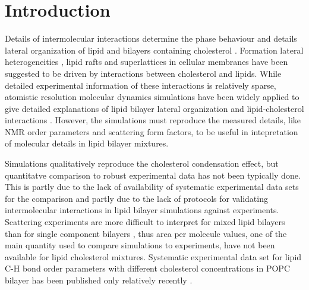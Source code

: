 \documentclass[aps,prl,superscriptaddress,twocolumn]{revtex4}
\begin{document}

\maketitle %



\section{Introduction}
Details of intermolecular interactions determine the phase
behaviour and details lateral organization of lipid and bilayers
containing cholesterol \cite{ipsen87}.
Formation lateral heterogeneities \cite{kinnunen91}, lipid rafts \cite{simons97}
and superlattices \cite{somerharju09} in cellular membranes have been
suggested to be driven by interactions between cholesterol
and lipids. While detailed experimental information of these interactions
is relatively sparse, atomistic resolution molecular dynamics simulations
have been widely applied to give detailed explanations of lipid bilayer
lateral organization and lipid-cholesterol interactions \cite{rog14,sodt14,??}.
However, the simulations must reproduce the measured details, like NMR
order parameters and scattering form factors, to be useful in intepretation
of molecular details in lipid bilayer mixtures.

Simulations qualitatively reproduce the cholesterol condensation effect,
but quantitatve comparison to robust experimental data has not been
typically done. This is partly due to the lack of availability of
systematic experimental data sets for the comparison and partly
due to the lack of protocols for validating intermolecular interactions
in lipid bilayer simulations against experiments.
Scattering experiments are more difficult to interpret for
mixed lipid bilayers than for single component bilayers \cite{pan12,Heftberger15,Marquardt15,??},
thus area per molecule values, one of the main quantity used to
compare simulations to experiments, have not been
available for lipid cholesterol mixtures. Systematic experimental
data set for lipid C-H bond order parameters with different cholesterol
concentrations in POPC bilayer has been published only relatively recently \cite{ferreira13}.
\end{document}
